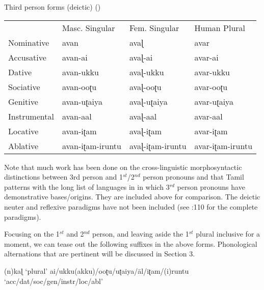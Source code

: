 \documentclass[output=paper,colorlinks,citecolor=brown,
]{langscibook}
\begin{document}
\begin{exe}
\begin{xlist}
\ex \label{new2c} Third person forms (deictic) 
(\citet{steever2019dravidian})
\\
\begin{tabular}{llll}
             & Masc. Singular   & Fem. Singular    & Human Plural     \\
Nominative   & avan             & avaɭ             & avar             \\
Accusative   & avan-ai          & avaɭ-ai          & avar-ai          \\
Dative       & avan-ukku        & avaɭ-ukku        & avar-ukku        \\
Sociative    & avan-ooʈu        & avaɭ-ooʈu        & avar-ooʈu        \\
Genitive     & avan-uʈaiya      & avaɭ-uʈaiya      & avar-uʈaiya      \\
Instrumental & avan-aal         & avaɭ-aal         & avar-aal         \\
Locative     & avan-iʈam        & avaɭ-iʈam        & avar-iʈam        \\
Ablative     & avan-iʈam-iruntu & avaɭ-iʈam-iruntu & avar-iʈam-iruntu
\end{tabular} 

\end{xlist}
\end{exe}

Note that much work has been done on the cross-linguistic morphosyntactic distinctions between 3rd person and 1$^{st}$/2$^{nd}$ person pronouns and that Tamil patterns with the long list of languages in \citet{harley2002person} in which 3$^{rd}$ person pronouns have demonstrative bases/origins. They are included above for comparison. The deictic neuter and reflexive paradigms have not been included (see \citet{steever2019dravidian}:110 for the complete paradigms). 

Focusing on the 1$^{st}$ and 2$^{nd}$ person, and leaving aside the 1$^{st}$ plural inclusive for a moment, we can tease out the following suffixes in the above forms. Phonological alternations that are pertinent will be discussed in Section 3.

\begin{exe}
\ex \label{new3}
\begin{xlist}
\ex \label{new3a}
(n)kaɭ \hspace{4cm} ‘plural’
\ex \label{new3b}
ai/ukku(akku)/ooʈu/uʈaiya/āl/iʈam/(i)runtu  \\ \hspace{9cm}  ‘acc/dat/soc/gen/instr/loc/abl’
\end{xlist}
\end{exe}
\end{document}
